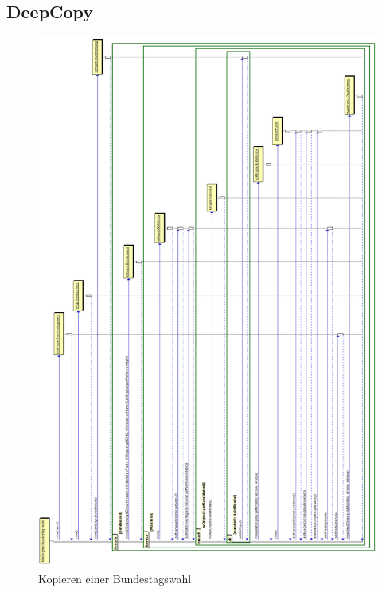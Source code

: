 \documentclass[12pt,a4paper,titlepage]{article}
\begin{document}
\subsection{DeepCopy}
\begin{figure}[!ht]
\centering
\includegraphics[scale=0.37]{DeepCopy.png} \caption{Kopieren einer Bundestagswahl} 
\end{figure}
\newpage
\end{document}
